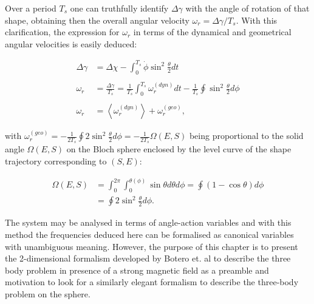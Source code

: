 Over a period $T_s$ one can truthfully identify $\Delta \gamma$ with the angle of rotation of that shape, obtaining then the overall angular velocity $\omega_r = \Delta \gamma /T_s$. With this clarification, the expression for $\omega_r$ in terms of the dynamical and geometrical angular velocities is easily deduced:

\begin{align*}
\Delta \gamma &= \Delta \chi - \int_0^{T_s}\dot{\phi}\sin^2{\frac{\theta}{2}}dt\\
\\
\omega_r &= \frac{\Delta \gamma}{T_s} = \frac{1}{T_s}\int_0^{T_s}\omega_r^{(dyn)}dt -\frac{1}{T_s}\oint\sin^2{\frac{\theta}{2}}d\phi\\
\\
\omega_r &= \left\langle \omega_r^{(dyn)} \right\rangle + \omega_r^{(geo)},
\end{align*}

with $\omega_r^{(geo)}= -\frac{1}{2T_s}\oint 2\sin^2{\frac{\theta}{2}}d\phi = -\frac{1}{2T_s}\Omega(E,S)$ being proportional to the solid angle $\Omega(E,S)$ on the Bloch sphere enclosed by the level curve of the shape trajectory corresponding to $(S,E)$:

\begin{align*}
\Omega(E,S) &= \int_0^{2\pi}\int_0^{\theta(\phi)} \sin{\theta}d\theta d\phi = \oint (1-\cos{\theta})d\phi\\ 
&= \oint 2\sin^2{\frac{\theta}{2}}d\phi.
\end{align*}

The system may be analysed in terms of angle-action variables and with this method the frequencies deduced here can be formalised as canonical variables with unambiguous meaning. However, the purpose of this chapter is to present the 2-dimensional formalism developed by Botero et. al to describe the three body problem in presence of a strong magnetic field as a preamble and motivation to look for a similarly elegant formalism to describe the three-body problem on the sphere.





